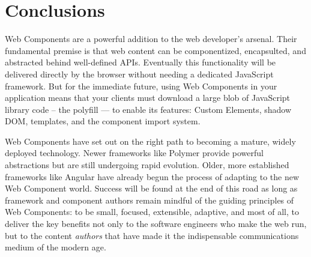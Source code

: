 \chapter{Conclusions}
%

Web Components are a powerful addition to the web developer's arsenal. 
Their fundamental premise is that web content can be componentized, encapsulted, and abstracted behind well-defined APIs.
Eventually this functionality will be delivered directly by the browser without needing a dedicated JavaScript framework.
But for the immediate future, using Web Components in your application means that your clients must download a large blob of JavaScript library code -- the polyfill --- 
to enable its features: 
Custom Elements, 
shadow DOM, 
templates, and 
the component import system.

Web Components have set out on the right path to becoming a mature, widely deployed technology. 
Newer frameworks like Polymer provide powerful abstractions but are still undergoing rapid evolution.
Older, more established frameworks like Angular have already begun the process of adapting to the new Web Component world. 
Success will be found at the end of this road as long as framework and component authors remain mindful of the guiding principles of Web Components: 
to be small, focused, extensible, adaptive, 
and most of all, 
to deliver the key benefits 
not only to the software engineers who make the web run,
but to the content \textit{authors} that have made it the indispensable communications medium of the modern age.
